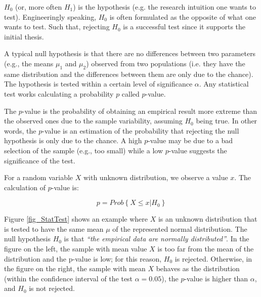 $H_0$ (or, more often $H_1$) is the hypothesis (e.g. the research intuition one wants to test). Engineeringly speaking, $H_0$ is often formulated as the opposite of what one wants to test. Such that, rejecting $H_0$ is a successful test since it supports the initial thesis.\par

A typical null hypothesis is that there are no differences between two parameters (e.g., the means $\mu_1$ and $\mu_2$) observed from two populations (i.e. they have the same distribution and the differences between them are only due to the chance). The hypothesis is tested within a certain level of significance $\alpha$. Any statistical test works calculating a probability $p$ called $p$-value.\par

The $p$-value is the probability of obtaining an empirical result more extreme than the observed ones due to the sample variability, assuming $H_0$ being true. In other words, the $p$-value is an estimation of the probability that rejecting the null hypothesis is only due to the chance. A high $p$-value may be due to a bad selection of the sample (e.g., too small) while a low $p$-value suggests the significance of the test.\par

For a random variable $X$ with unknown distribution, we observe a value $x$. The calculation of $p$-value is:

\begin{equation}
p=Prob\left\{ X\le x|H_0\right\}
\label{eq_pvalue}
\end{equation}

Figure \ref{fig_StatTest} shows an example where $X$ is an unknown distribution that is tested to have the same mean $\mu$ of the represented normal distribution. The null hypothesis $H_0$ is that \textit{“the empirical data are normally distributed”}. In the figure on the left, the sample with mean value $X$ is too far from the mean of the distribution and the p-value is low; for this reason, $H_0$ is rejected. Otherwise, in the figure on the right, the sample with mean $X$ behaves as the distribution (within the confidence interval of the test $\alpha=0.05$), the $p$-value is higher than $\alpha$, and $H_0$ is not rejected.

